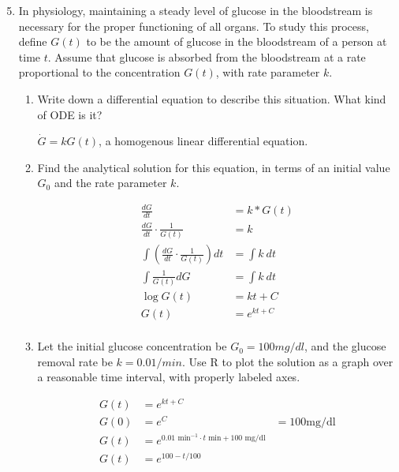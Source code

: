 \documentclass[10pt,letterpaper]{article}
\begin{document}
\begin{enumerate}
  \setcounter{enumi}{4}
  
  \item In physiology, maintaining a steady level of glucose in the bloodstream is necessary for the proper functioning of all organs. To study
  this process, define $G(t)$ to be the amount of glucose in the bloodstream of a person at time $t$. Assume that glucose is absorbed from the bloodstream at a rate proportional to the concentration $G(t)$, with rate parameter $k$.
  \begin{enumerate}
    \item Write down a differential equation to describe this situation. What kind of ODE is it?
    
    \begin{Solution}
      $\dot G = k G(t) $, a homogenous linear differential equation.
    \end{Solution}
    
    \item Find the analytical solution for this equation, in terms of an initial value $G_0$ and the rate parameter $k$.
    
    \begin{Solution}
      \begin{align*}
        \frac{d G}{d t} &= k * G(t) \\
        \frac{d G}{d t} \cdot \frac{1}{G(t)} &= k \\
        \int \left( \frac{d G}{d t} \cdot \frac{1}{G(t)} \right) d t &= \int k \ d t \\
        \int \frac{1}{G(t)} dG &= \int k \ dt \\
        \log G(t) &= k t + C \\
        G(t) &= e^{k t + C} \\
      \end{align*}
    \end{Solution}
        
    \item Let the initial glucose concentration be $G_0 = 100 mg/dl$, and the glucose removal rate be $k = 0.01 / min$. Use R to plot the solution as a graph over a reasonable time interval, with properly labeled axes.
    
    \begin{Solution}
      \begin{eqnarray*}
        G(t) &= e^{k t +  C} \\
        G(0) &= e^{C} &= 100 \text{mg/dl} \\
        G(t) &= e^{0.01 \text{ min$^{-1}$} \cdot t \text{ min} + 100 \text{ mg/dl} } \\
        G(t) &= e^{100 - t / 100}
      \end{eqnarray*}
      

\end{Solution}
\end{enumerate}
\end{enumerate}
\end{document}
